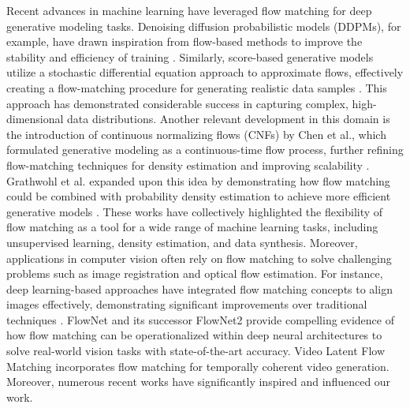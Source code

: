 Recent advances in machine learning have leveraged flow matching for deep generative modeling tasks. Denoising diffusion probabilistic models (DDPMs), for example, have drawn inspiration from flow-based methods to improve the stability and efficiency of training \cite{ho2020denoising}. Similarly, score-based generative models utilize a stochastic differential equation approach to approximate flows, effectively creating a flow-matching procedure for generating realistic data samples \cite{song2021score}. This approach has demonstrated considerable success in capturing complex, high-dimensional data distributions. Another relevant development in this domain is the introduction of continuous normalizing flows (CNFs) by Chen et al., which formulated generative modeling as a continuous-time flow process, further refining flow-matching techniques for density estimation and improving scalability \cite{chen2018neural}. Grathwohl et al. expanded upon this idea by demonstrating how flow matching could be combined with probability density estimation to achieve more efficient generative models \cite{grathwohl2018ffjord}. These works have collectively highlighted the flexibility of flow matching as a tool for a wide range of machine learning tasks, including unsupervised learning, density estimation, and data synthesis. Moreover, applications in computer vision often rely on flow matching to solve challenging problems such as image registration and optical flow estimation. For instance, deep learning-based approaches have integrated flow matching concepts to align images effectively, demonstrating significant improvements over traditional techniques \cite{dosovitskiy2015flownet, ilg2017flownet2}. FlowNet and its successor FlowNet2 provide compelling evidence of how flow matching can be operationalized within deep neural architectures to solve real-world vision tasks with state-of-the-art accuracy. Video Latent Flow Matching \cite{csy25,jsl+24,dsf23} incorporates flow matching for temporally coherent video generation.
Moreover, numerous recent works \cite{zcwt23,lss+24_relu,cls+24,lss+24_multi_layer,wxz+24,wcz+23,cgl+25_homo,xlc+24,wcy+23,sph+23,cxj24,fjl+24,kll+25,kll+25_tc,cll+25_var,kls+25_dpbloom,lsss24_dpntk,cll+25_deskrej,lssz24_gm,llss24_softmax,lzw+24,hwsl24,hwl+24,ssz+25_dit,ssz+25_prune} have significantly inspired and influenced our work.

